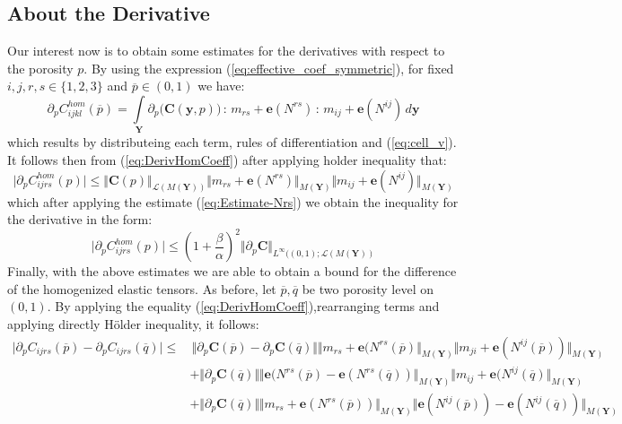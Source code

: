 \subsection{About the Derivative}
Our interest now is to obtain some estimates for the derivatives with respect to the porosity $p$. By using the expression (\ref{eq:effective_coef_symmetric}), for fixed $i,j,r,s \in \{1,2,3\}$ and $\overline{p} \in (0,1)$ we have:
\begin{equation}
    \label{eq:DerivHomCoeff}
    \partial_{p}  C_{ijkl}^{hom} (\overline{p}) = \int\limits_{\mathbf{Y}} \partial_{p}\big( \mathbf{C}(\mathbf{y},p) \big)\, : \,m_{rs}+\mathbf{e}(N^{rs})\, :\,m_{ij}+\mathbf{e}(N^{ij}) \, d\mathbf{y} 
\end{equation}
which results by distributeing each term, rules of differentiation and (\ref{eq:cell_v}).
It follows then from (\ref{eq:DerivHomCoeff}) after applying holder inequality that:
\begin{equation*}
    \vert \partial_p C^{hom}_{ijrs}(p) \vert \leq \Vert \mathbf{C}(p) \Vert_{\mathcal{L}(M(\mathbf{Y}))} \Vert m_{rs} + \mathbf{e}(N^{rs}) \Vert_{M(\mathbf{Y})} \Vert m_{ij} + \mathbf{e}(N^{ij}) \Vert_{M(\mathbf{Y})}
\end{equation*}
which after applying the estimate (\ref{eq:Estimate-Nrs}) we obtain the inequality for the derivative in the form:
\begin{equation}
    \label{EstimateDerivHomCoeff}
    \vert \partial_p C^{hom}_{ijrs}(p) \vert \leq (1+\frac{\beta}{\alpha})^2 \Vert \partial_p \mathbf{C}\Vert_{L^{\infty}((0,1); \mathcal{L}(M(\mathbf{Y}))}
\end{equation}
Finally, with the above estimates we are able to obtain a bound for the difference of the homogenized elastic tensors. As before, let $\overline{p}, \overline{q}$ be two porosity level on $(0,1)$.
By applying the equality (\ref{eq:DerivHomCoeff}),rearranging terms and applying directly H\"{o}lder inequality, it follows:
\begin{align*}
    \vert \partial_p C_{ijrs}(\overline{p}) - \partial_p C_{ijrs}(\overline{q}) \vert \leq & \,\Vert \partial_p \mathbf{C}(\overline{p}) - \partial_p \mathbf{C}(\overline{q}) \Vert \Vert m_{rs} + \mathbf{e}(N^{rs}(\overline{p}) \Vert_{M(\mathbf{Y})} \Vert m_{ji} + \mathbf{e}(N^{ij}(\overline{p}))\Vert_{M(\mathbf{Y})} \\
    & + \Vert \partial_p \mathbf{C}(\overline{q}) \Vert \Vert \mathbf{e}(N^{rs}(\overline{p}) -\mathbf{e}(N^{rs}(\overline{q})) \Vert_{M(\mathbf{Y})} \Vert m_{ij} + \mathbf{e}(N^{ij}(\overline{q}) \Vert_{M(\mathbf{Y})}  \\
    & + \Vert \partial_p \mathbf{C}(\overline{q}) \Vert \Vert m_{rs} + \mathbf{e}(N^{rs}(\overline{p})) \Vert_{M(\mathbf{Y})} \Vert \mathbf{e}(N^{ij}(\overline{p})) - \mathbf{e}(N^{ij}(\overline{q})) \Vert_{M(\mathbf{Y})}
\end{align*}

